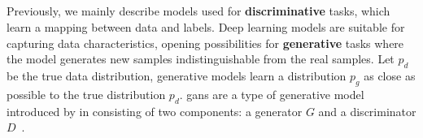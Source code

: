 \documentclass[../main.tex]{subfiles}
\begin{document}
	\subsection{}\label{sec:gan}
		Previously, we mainly describe models used for \textbf{discriminative} tasks, which learn a mapping between data and labels.
		Deep learning models are suitable for capturing data characteristics, opening possibilities for \textbf{generative} tasks where the model generates new samples indistinguishable from the real samples.
		Let \(p_{d}\) be the true data distribution, generative models learn a distribution \(p_{g}\) as close as possible to the true distribution \(p_{d}\).
		\Glspl{gan} are a type of generative model introduced by \citeauthor{Goodfellow2014GAN} in \citeyear{Goodfellow2014GAN} consisting of two components: a generator \(G\) and a discriminator \(D\)~\cite{Goodfellow2014GAN}.
\end{document}
